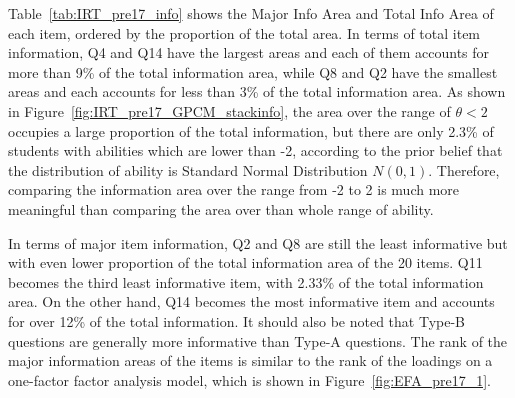 \documentclass[a4paper]{report}
\begin{document}
Table~\ref{tab:IRT_pre17_info} shows the Major Info Area and Total Info Area of each item, ordered by the proportion of the total area. In terms of total item information, Q4 and Q14 have the largest areas and each of them accounts for more than 9\% of the total information area, while Q8 and Q2 have the smallest areas and each accounts for less than 3\% of the total information area. As shown in Figure~\ref{fig:IRT_pre17_GPCM_stackinfo}, the area over the range of $\theta<2$ occupies a large proportion of the total information, but there are only 2.3\% of students with abilities which are lower than -2, according to the prior belief that the distribution of ability is Standard Normal Distribution $N(0,1)$. Therefore, comparing the information area over the range from -2 to 2 is much more meaningful than comparing the area over than whole range of ability. 

In terms of major item information, Q2 and Q8 are still the least informative but with even lower proportion of the total information area of the 20 items. Q11 becomes the third least informative item, with 2.33\% of the total information area. On the other hand, Q14 becomes the most informative item and accounts for over 12\% of the total information. It should also be noted that Type-B questions are generally more informative than Type-A questions. The rank of the major information areas of the items is similar to the rank of the loadings on a one-factor factor analysis model, which is shown in Figure~\ref{fig:EFA_pre17_1}.  
\end{document}
